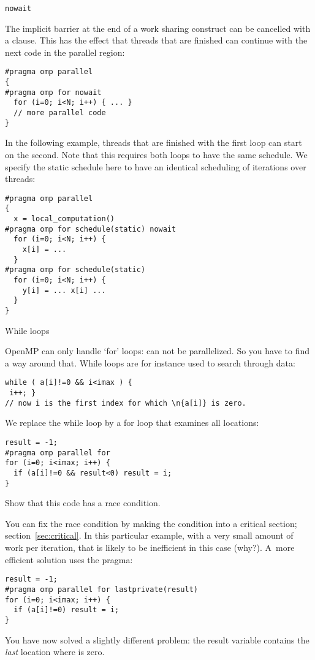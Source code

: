  {\texttt{nowait}}
\label{sec:omp-nowait}

The implicit barrier at the end of a work sharing construct
can be cancelled with a
 clause.
This has the effect that threads that are finished can continue
with the next code in the parallel region:
\begin{lstlisting}
#pragma omp parallel
{
#pragma omp for nowait
  for (i=0; i<N; i++) { ... }
  // more parallel code
}
\end{lstlisting}

In the following example, threads that are finished with the first loop
can start on the second. Note that this requires both loops to have
the same schedule. We specify the static schedule here to have an
identical scheduling of iterations over threads:
\begin{lstlisting}
#pragma omp parallel
{
  x = local_computation()
#pragma omp for schedule(static) nowait
  for (i=0; i<N; i++) { 
    x[i] = ... 
  }
#pragma omp for schedule(static)
  for (i=0; i<N; i++) { 
    y[i] = ... x[i] ...
  }
}
\end{lstlisting}

 {While loops}

OpenMP can only handle `for' loops:  can not
be parallelized. So you have to find a way around that. While loops
are for instance used to search through data:
\begin{lstlisting}
while ( a[i]!=0 && i<imax ) {
 i++; }
// now i is the first index for which \n{a[i]} is zero.
\end{lstlisting}
We replace the while loop by a for loop that examines all locations:
\begin{lstlisting}
result = -1;
#pragma omp parallel for
for (i=0; i<imax; i++) {
  if (a[i]!=0 && result<0) result = i;
}
\end{lstlisting}
\begin{exercise}
  Show that this code has a race condition.
\end{exercise}
You can fix the race condition by making the condition into a critical section;
section~\ref{sec:critical}. In this particular example, with a very small amount
of work per iteration, that is likely to be inefficient 
in this case (why?).
A~more efficient solution uses the  pragma:
\begin{lstlisting}
result = -1;
#pragma omp parallel for lastprivate(result)
for (i=0; i<imax; i++) {
  if (a[i]!=0) result = i;
}
\end{lstlisting}
You have now solved a slightly different problem: the result variable
contains the \emph{last} location where  is zero.

